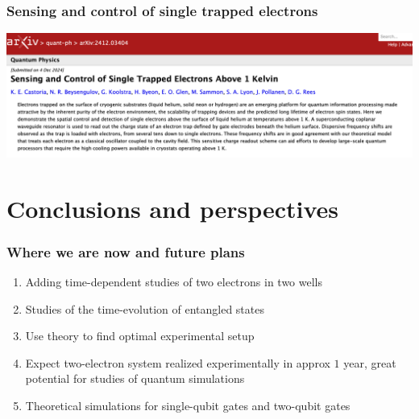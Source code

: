 \documentclass{beamer}
\begin{document}
\begin{frame}
\frametitle{Sensing and control of single trapped electrons}
\centerline{\includegraphics[width=1.2\linewidth]{qcfigures/sensing.png}}
\end{frame}







\section{Conclusions and perspectives}

\begin{frame}
\frametitle{Where we are now and future plans}

\begin{enumerate}
\item Adding time-dependent studies of two electrons in two wells

\item Studies of the time-evolution of entangled states

\item Use theory to find optimal experimental setup

\item Expect two-electron system realized experimentally in approx $1$ year, great potential for studies of quantum simulations

\item Theoretical simulations for single-qubit gates and two-qubit gates  
\end{enumerate}

\noindent
\end{frame}
\end{document}
